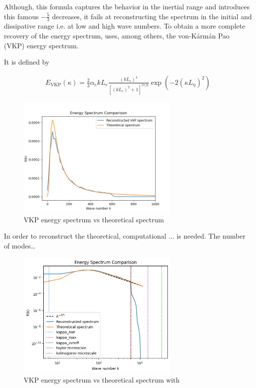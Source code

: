 \documentclass[a4paper,12pt]{article}
\theoremstyle{definition}
\begin{document}
Although, this formula captures the behavior in the inertial range and introduces this famous $-\frac{5}{3}$ decreases, it fails at reconstructing the spectrum in the initial and dissipative range i.e. at low and high wave numbers. To obtain a more complete recovery of the energy spectrum, \cite{Janin2021} uses, among others, the von-Kármán Pao (VKP) energy spectrum.
\bigskip

It is defined by 

\begin{align}
    E_{\text{VKP}}(\kappa)=\frac{2}{3}\alpha_e k L_e \frac{(kL_e)^4}{[(kL_e)^2+1]^{17/6}}\exp(-2(\kappa L_\eta)^2)
\end{align}

\begin{figure}[H]
    \centering
    \includegraphics[width=0.7\textwidth]{illustrations/Energy_Spectrum_VKP.png}
    \caption{VKP energy spectrum vs theoretical spectrum}
    \label{VKPspectrum}
\end{figure}

In order to reconstruct the theoretical, computational ... is needed. The number of modes\dots
 

\begin{figure}[H]
    \centering
    \includegraphics[width=0.7\textwidth]{illustrations/EnergySpectrumTrained.png}
    \caption{VKP energy spectrum vs theoretical spectrum with}
\end{figure}
\end{document}
